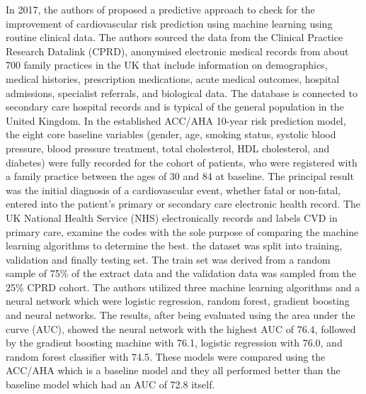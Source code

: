 \documentclass[12pt, a4paper,twoside]{report}
\numberwithin{equation}{chapter}
\begin{document}
In 2017, the authors of \cite{weng2017can} proposed a predictive approach to check for the improvement of cardiovascular risk prediction using machine learning using routine clinical data. The authors sourced the data from the Clinical Practice Research Datalink (CPRD), anonymised electronic medical records from about 700 family practices in the UK that include information on demographics, medical histories, prescription medications, acute medical outcomes, hospital admissions, specialist referrals, and biological data. The database is connected to secondary care hospital records and is typical of the general population in the United Kingdom. In the established ACC/AHA 10-year risk prediction model, the eight core baseline variables (gender, age, smoking status, systolic blood pressure, blood pressure treatment, total cholesterol, HDL cholesterol, and diabetes) were fully recorded for the cohort of patients, who were registered with a family practice between the ages of 30 and 84 at baseline. The principal result was the initial diagnosis of a cardiovascular event, whether fatal or non-fatal, entered into the patient's primary or secondary care electronic health record. The UK National Health Service (NHS) electronically records and labels CVD in primary care, examine the codes with the sole purpose of comparing the machine learning algorithms to determine the best. the dataset was split into training, validation and finally testing set. The train set was derived from a random sample of 75\% of the extract data and the validation data was sampled from the 25\% CPRD cohort. The authors utilized three machine learning algorithms and a neural network which were logistic regression, random forest, gradient boosting and neural networks. The results, after being evaluated using the area under the curve (AUC), showed the neural network with the highest AUC of 76.4, followed by the gradient boosting machine with 76.1, logistic regression with 76.0, and random forest classifier with 74.5. These models were compared using the ACC/AHA which is a baseline model and they all performed better than the baseline model which had an AUC of 72.8 itself.
\end{document}
